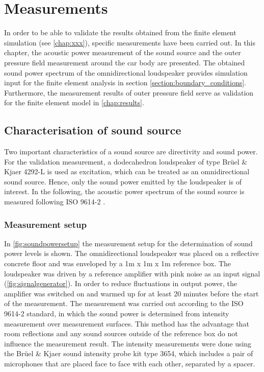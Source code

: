 \chapter{Measurements}
\label{chap:measurement}

In order to be able to validate the results obtained from the finite element simulation (see \cref{chap:xxx}), specific measurements have been carried out.
In this chapter, the acoustic power measurement of the sound source and the outer pressure field measurement around the car body are presented.
The obtained sound power spectrum of the omnidirectional loudspeaker provides simulation input for the finite element analysis in section \ref{section:boundary_conditions}.
Furthermore, the measurement results of outer pressure field serve as validation for the finite element model in \cref{chap:results}.

\section{Characterisation of sound source}
\label{section:SWL_measurement}

Two important characteristics of a sound source are directivity and sound power. For the validation measurement, a dodecahedron loudspeaker of type Brüel \& Kjaer 4292-L is used as excitation, which can be treated as an omnidirectional sound source.
Hence, only the sound power emitted by the loudspeaker is of interest.
In the following, the acoustic power spectrum of the sound source is measured following ISO 9614-2 \cite{din19969614}.

\subsection*{Measurement setup}

In \cref{fig:soundpowersetup} the measurement setup for the determination of sound power levels is shown.
The omnidirectional loudspeaker was placed on a reflective concrete floor and was enveloped by a 1m x 1m x 1m reference box.
The loudspeaker was driven by a reference amplifier with pink noise as an input signal (\cref{fig:signalgenerator}).
In order to reduce fluctuations in output power, the amplifier was switched on and warmed up for at least 20 minutes before the start of the measurement.
The measurement was carried out according to the ISO 9614-2 standard, in which the sound power is determined from intensity measurement over measurement surfaces.
This method has the advantage that room reflections and any sound sources outside of the reference box do not influence the measurement result.
The intensity measurements were done using the Brüel \& Kjaer sound intensity probe kit type 3654, which includes a pair of microphones that are placed face to face with each other, separated by a spacer.

